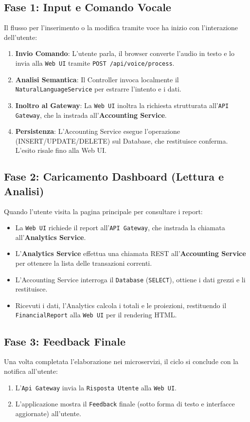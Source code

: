 \subsection{Fase 1: Input e Comando Vocale}
Il flusso per l'inserimento o la modifica tramite voce ha inizio con l'interazione dell'utente:
\begin{enumerate}
    \item \textbf{Invio Comando}: L'utente parla, il browser converte l'audio in testo e lo invia alla \texttt{Web UI} tramite \texttt{POST /api/voice/process}.
    \item \textbf{Analisi Semantica}: Il Controller invoca localmente il \texttt{NaturalLanguageService} per estrarre l'intento e i dati.
    \item \textbf{Inoltro al Gateway}: La \texttt{Web UI} inoltra la richiesta strutturata all'\texttt{API Gateway}, che la instrada all'\textbf{Accounting Service}.
    \item \textbf{Persistenza}: L'Accounting Service esegue l'operazione (INSERT/UPDATE/DELETE) sul Database, che restituisce conferma. L'esito risale fino alla Web UI.
\end{enumerate}

\subsection{Fase 2: Caricamento Dashboard (Lettura e Analisi)}
Quando l'utente visita la pagina principale per consultare i report:
\begin{itemize}
    \item La \texttt{Web UI} richiede il report all'\texttt{API Gateway}, che instrada la chiamata all'\textbf{Analytics Service}.
    \item L'\textbf{Analytics Service} effettua una chiamata REST all'\textbf{Accounting Service} per ottenere la lista delle transazioni correnti.
    \item L'Accounting Service interroga il \texttt{Database} (\texttt{SELECT}), ottiene i dati grezzi e li restituisce.
    \item Ricevuti i dati, l'Analytics calcola i totali e le proiezioni, restituendo il \texttt{FinancialReport} alla \texttt{Web UI} per il rendering HTML.
\end{itemize}

\subsection{Fase 3: Feedback Finale}
Una volta completata l'elaborazione nei microservizi, il ciclo si conclude con la notifica all'utente:
\begin{enumerate}
    \item L'\texttt{Api Gateway} invia la \texttt{Risposta Utente} alla \texttt{Web UI}.
    \item L'applicazione mostra il \texttt{Feedback} finale (sotto forma di testo e interfacce aggiornate) all'utente.
\end{enumerate}

